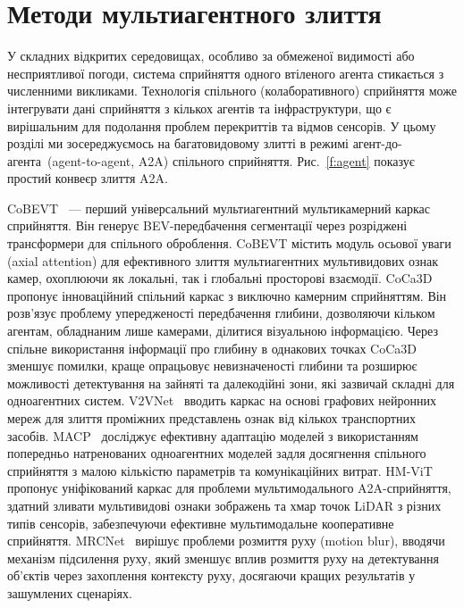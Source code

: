 \section{Методи мультиагентного злиття}
\label{s:multi-view}

У складних відкритих середовищах, особливо за обмеженої видимості або несприятливої погоди, система сприйняття одного втіленого агента стикається з численними викликами.
Технологія спільного (колаборативного) сприйняття може інтегрувати дані сприйняття з кількох агентів та інфраструктури, що є вирішальним для подолання проблем перекриттів та відмов сенсорів.
У цьому розділі ми зосереджуємось на багатовидовому злитті в режимі агент-до-агента~(agent-to-agent, A2A) спільного сприйняття.
Рис.~\ref{f:agent} показує простий конвеєр злиття A2A.

CoBEVT~\cite{xu2022cobevt} — перший універсальний мультиагентний мультикамерний каркас сприйняття. Він генерує BEV-передбачення сегментації через розріджені трансформери для спільного оброблення. CoBEVT містить модуль осьової уваги (axial attention) для ефективного злиття мультиагентних мультивидових ознак камер, охоплюючи як локальні, так і глобальні просторові взаємодії.
CoCa3D~\cite{hu2023collaboration} пропонує інноваційний спільний каркас з виключно камерним сприйняттям. Він розв'язує проблему упередженості передбачення глибини, дозволяючи кільком агентам, обладнаним лише камерами, ділитися візуальною інформацією. Через спільне використання інформації про глибину в однакових точках CoCa3D зменшує помилки, краще опрацьовує невизначеності глибини та розширює можливості детектування на зайняті та далекодійні зони, які зазвичай складні для одноагентних систем.
V2VNet~\cite{wang2020v2vnet} вводить каркас на основі графових нейронних мереж для злиття проміжних представлень ознак від кількох транспортних засобів.
MACP~\cite{ma2024macp} досліджує ефективну адаптацію моделей з використанням попередньо натренованих одноагентних моделей задля досягнення спільного сприйняття з малою кількістю параметрів та комунікаційних витрат.
HM-ViT~\cite{xiang2023hm} пропонує уніфікований каркас для проблеми мультимодального A2A-сприйняття, здатний зливати мультивидові ознаки зображень та хмар точок LiDAR з різних типів сенсорів, забезпечуючи ефективне мультимодальне кооперативне сприйняття.
MRCNet~\cite{hong2024multi} вирішує проблеми розмиття руху (motion blur), вводячи механізм підсилення руху, який зменшує вплив розмиття руху на детектування об'єктів через захоплення контексту руху, досягаючи кращих результатів у зашумлених сценаріях.

